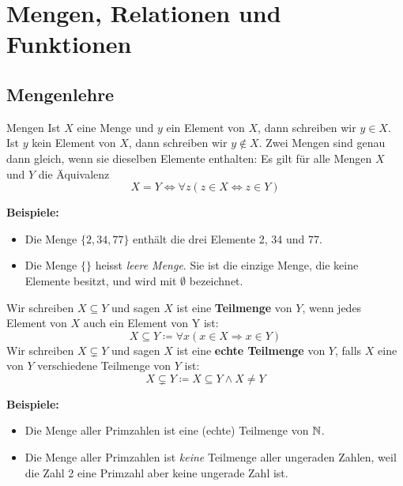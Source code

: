 \section{Mengen, Relationen und Funktionen}\label{sec:mengen-relationen-und-funktionen}

\subsection{Mengenlehre}\label{subsec:mengenlehre}

\begin{definition}{Mengen}
    Ist $X$ eine Menge und $y$ ein Element von $X$, dann schreiben wir $y \in X$.
    Ist $y$ kein Element von $X$, dann schreiben wir $y \notin X$.
    Zwei Mengen sind genau dann gleich, wenn sie dieselben Elemente enthalten: Es gilt für alle Mengen $X$ und $Y$ die Äquivalenz \[X = Y \Leftrightarrow \forall z (z \in X \Leftrightarrow z \in Y)\]
\end{definition}

\textbf{Beispiele:}
\vspace{-\topsep}
\begin{itemize}
    \item Die Menge $\{2, 34, 77\}$ enthält die drei Elemente 2, 34 und 77.
    \item Die Menge $\{\}$ heisst \emph{leere Menge}.
    Sie ist die einzige Menge, die keine Elemente besitzt, und wird mit $\emptyset$ bezeichnet.
\end{itemize}

\vspace{-\topsep}

\begin{definition}{}
    Wir schreiben $X \subseteq Y$ und sagen $X$ ist eine \textbf{Teilmenge} von $Y$, wenn jedes Element von $X$ auch ein Element von Y ist:
    \[X \subseteq Y \coloneqq \forall x (x \in X \Rightarrow x \in Y)\]
    Wir schreiben $X \subsetneq Y$ und sagen $X$ ist eine \textbf{echte Teilmenge} von $Y$, falls $X$ eine von $Y$ verschiedene Teilmenge von $Y$ ist:
    \[X \subsetneq Y \coloneqq X \subseteq Y \land X \neq Y\]
\end{definition}

\textbf{Beispiele:}
\vspace{-\topsep}
\begin{itemize}
    \item Die Menge aller Primzahlen ist eine (echte) Teilmenge von $\mathbb{N}$.
    \item Die Menge aller Primzahlen ist \textit{keine} Teilmenge aller ungeraden Zahlen, weil die Zahl 2 eine Primzahl aber keine ungerade Zahl ist.
\end{itemize}

